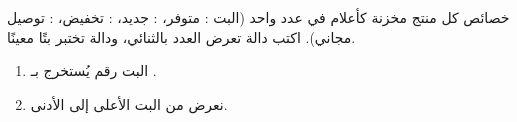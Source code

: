 \begin{statement}
خصائص كل منتج مخزنة كأعلام في عدد واحد (البت : متوفر، : جديد، : تخفيض، : توصيل مجاني). اكتب دالة  تعرض العدد بالثنائي، ودالة  تختبر بتًا معينًا.
\end{statement}
\begin{stepsbox}\begin{enumerate}
\item البت رقم  يُستخرج بـ .
\item نعرض من البت الأعلى إلى الأدنى.
\end{enumerate}\end{stepsbox}
